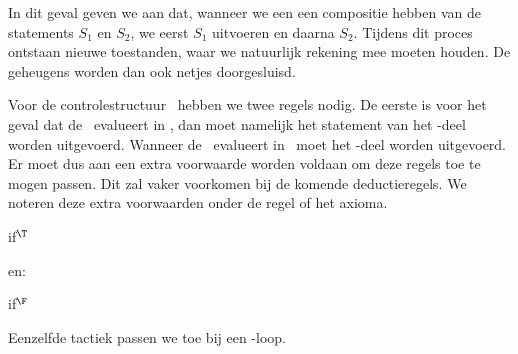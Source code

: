 In dit geval geven we aan dat, wanneer we een een compositie hebben van de statements $S_1$ en $S_2$, we eerst $S_1$ uitvoeren%
en daarna $S_2$. Tijdens dit proces ontstaan nieuwe toestanden, waar we natuurlijk rekening mee moeten houden. De geheugens worden dan ook netjes doorgesluisd.

Voor de controlestructuur \IF\ hebben we twee regels nodig. De eerste is voor het geval dat de \BExpr\ evalueert in \T, dan moet namelijk het statement van het \THEN-deel worden uitgevoerd. Wanneer de \BExpr\ evalueert in \F\ moet het \ELSE-deel worden uitgevoerd.
Er moet dus aan een extra voorwaarde worden voldaan om deze regels toe te mogen passen. Dit zal vaker voorkomen bij de komende deductieregels. We noteren deze extra voorwaarden onder de regel of het axioma.

\begin{NSAxiom}{if$^\T$}
  \begin{prooftree}
  \end{prooftree}
  \begin{NSConditions}
  \end{NSConditions}
\end{NSAxiom}

en:

\begin{NSAxiom}{if$^\F$}
  \begin{prooftree}
  \end{prooftree}
  \begin{NSConditions}
  \end{NSConditions}
\end{NSAxiom}

Eenzelfde tactiek passen we toe bij een \WHILE-loop.

